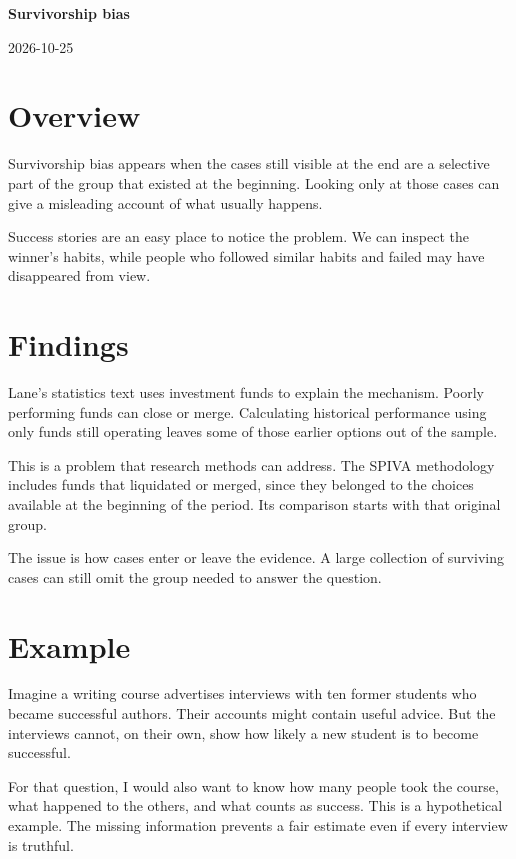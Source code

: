 \documentclass[11pt,a4paper]{article}
\newcommand{\researchtitle}{Survivorship bias}
\newcommand{\researchdate}{2026-10-25}
\begin{document}
{\LARGE\bfseries\researchtitle\par}
\vspace{0.4em}
{\small\researchdate\par}

\section{Overview}

Survivorship bias appears when the cases still visible at the end are a
selective part of the group that existed at the beginning. Looking only
at those cases can give a misleading account of what usually happens.
\cite{lane}

Success stories are an easy place to notice the problem. We can inspect
the winner's habits, while people who followed similar habits and failed
may have disappeared from view.

\section{Findings}

Lane's statistics text uses investment funds to explain the mechanism.
Poorly performing funds can close or merge. Calculating historical
performance using only funds still operating leaves some of those
earlier options out of the sample. \cite{lane}

This is a problem that research methods can address. The SPIVA methodology
includes funds that liquidated or merged, since they belonged to the
choices available at the beginning of the period. Its comparison starts
with that original group. \cite{spiva}

The issue is how cases enter or leave the evidence. A large collection
of surviving cases can still omit the group needed to answer the
question. \cite{lane}

\section{Example}

Imagine a writing course advertises interviews with ten former students
who became successful authors. Their accounts might contain useful advice.
But the interviews cannot, on their own, show how likely a new student is
to become successful.

For that question, I would also want to know how many people took the
course, what happened to the others, and what counts as success.
This is a hypothetical example. The missing information prevents a fair
estimate even if every interview is truthful.
\end{document}
